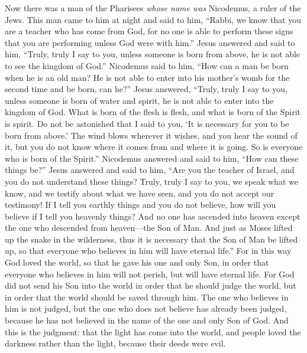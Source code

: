 \begin{biblechapter} %
 Now there was a man of the Pharisees \textit{whose name was} Nicodemus, a ruler of the Jews.
\verse This man came to him at night and said to him, “Rabbi, we know that you are a teacher who has come from God, for no one is able to perform these signs that you are performing unless God were with him.”
\verse Jesus answered and said to him, “Truly, truly I say to you, unless someone is born from above, he is not able to see the kingdom of God.”
\verse Nicodemus said to him, “How can a man be born when he is an old man? He is not able to enter into his mother’s womb for the second time and be born, can he?”
\verse Jesus answered, “Truly, truly I say to you, unless someone is born of water and spirit, he is not able to enter into the kingdom of God.
\verse What is born of the flesh is flesh, and what is born of the Spirit is spirit.
\verse Do not be astonished that I said to you, ‘It is necessary for you to be born from above.’
\verse The wind blows wherever it wishes, and you hear the sound of it, but you do not know where it comes from and where it is going. So is everyone who is born of the Spirit.”
\verse Nicodemus answered and said to him, “How can these things be?”
\verse Jesus answered and said to him, “Are you the teacher of Israel, and you do not understand these things?
\verse Truly, truly I say to you, we speak what we know, and we testify about what we have seen, and you do not accept our testimony!
\verse If I tell you earthly things and you do not believe, how will you believe if I tell you heavenly things?
\verse And no one has ascended into heaven except the one who descended from heaven—the Son of Man.
\verse And just as Moses lifted up the snake in the wilderness, thus it is necessary that the Son of Man be lifted up,
\verse so that everyone who believes in him will have eternal life.”
 For in this way God loved the world, so that he gave his one and only Son, in order that everyone who believes in him will not perish, but will have eternal life.
\verse For God did not send his Son into the world in order that he should judge the world, but in order that the world should be saved through him.
\verse The one who believes in him is not judged, but the one who does not believe has already been judged, because he has not believed in the name of the one and only Son of God.
\verse And this is the judgment: that the light has come into the world, and people loved the darkness rather than the light, because their deeds were evil.

\end{biblechapter}
